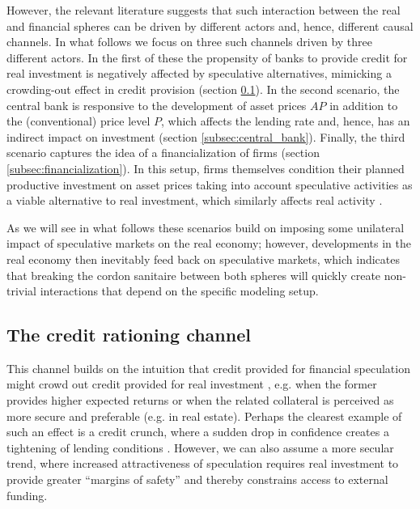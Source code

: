 \documentclass[12pt,a4paper]{article}
\begin{document}
However, the relevant literature suggests that such interaction between the real and financial spheres can be driven by different actors and, hence, different causal channels. In what follows we focus on three such channels driven by three different actors. In the first of these the propensity of banks to provide credit for real investment is negatively affected by speculative alternatives, mimicking a crowding-out effect in credit provision (section \ref{subsec:banks_ration}). In the second scenario, the central bank is responsive to the development of asset prices $AP$ in addition to the (conventional) price level $P$, which affects the lending rate and, hence, has an indirect impact on investment (section \ref{subsec:central_bank}). Finally, the third scenario captures the idea of a financialization of firms (section \ref{subsec:financialization}). In this setup, firms themselves condition their planned productive investment on asset prices taking into account speculative activities as a viable alternative to real investment, which similarly affects real activity \citep{stockhammerFinancialisationSlowdownAccumulation2004,stockhammerFinancialisationDebateTransdisciplinary2026}.

As we will see in what follows these scenarios build on imposing some unilateral impact of speculative markets on the real economy; however, developments in the real economy then inevitably feed back on speculative markets, which indicates that breaking the cordon sanitaire between both spheres will quickly create non-trivial interactions that depend on the specific modeling setup.

\subsection{The credit rationing channel} \label{subsec:banks_ration}

This channel builds on the intuition that credit provided for financial speculation might crowd out credit provided for real investment \citep{wolfsonPostKeynesianTheory1996}, e.g. when the former provides higher expected returns or when the related collateral is perceived as more secure and preferable (e.g. in real estate). Perhaps the clearest example of such an effect is a credit crunch, where a sudden drop in confidence creates a tightening of lending conditions \citep[as in][]{kapellerDebtBoomBust2014}. However, we can also assume a more secular trend, where increased attractiveness of speculation requires real investment to provide greater ``margins of safety'' \citep[][Ch. 8]{minskyStabilizingUnstableEconomy1986} and thereby constrains access to external funding.
\end{document}
